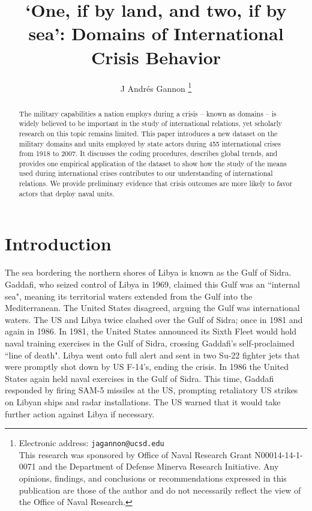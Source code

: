 \documentclass[12pt,letterpaper]{article}
\title{‘One, if by land, and two, if by sea’: Domains of International Crisis Behavior}
\author{J Andr\'{e}s Gannon%
	\thanks{Electronic address: \texttt{jagannon@ucsd.edu} \\ This research was sponsored by Office of Naval Research Grant N00014-14-1-0071 and the Department of Defense Minerva Research Initiative. Any opinions, findings, and conclusions or recommendations expressed in this publication are those of the author and do not necessarily reflect the view of the Office of Naval Research.}}
\affil{Department of Political Science \\ University of California, San Diego}
\begin{document}
\maketitle
	
\begin{abstract}
The military capabilities a nation employs during a crisis -- known as domains -- is widely believed to be important in the study of international relations, yet scholarly research on this topic remains limited. This paper introduces a new dataset on the military domains and units employed by state actors during 455 international crises from 1918 to 2007. It discusses the coding procedures, describes global trends, and provides one empirical application of the dataset to show how the study of the means used during international crises contributes to our understanding of international relations. We provide preliminary evidence that crisis outcomes are more likely to favor actors that deploy naval units.
\end{abstract}

\section{Introduction}
	The sea bordering the northern shores of Libya is known as the Gulf of Sidra. Gaddafi, who seized control of Libya in 1969, claimed this Gulf was an ``internal sea", meaning its territorial waters extended from the Gulf into the Mediterranean. The United States disagreed, arguing the Gulf was international waters. The US and Libya twice clashed over the Gulf of Sidra; once in 1981 and again in 1986. In 1981, the United States announced its Sixth Fleet would hold naval training exercises in the Gulf of Sidra, crossing Gaddafi's self-proclaimed ``line of death". Libya went onto full alert and sent in two Su-22 fighter jets that were promptly shot down by US F-14's, ending the crisis. In 1986 the United States again held naval exercises in the Gulf of Sidra. This time, Gaddafi responded by firing SAM-5 missiles at the US, prompting retaliatory US strikes on Libyan ships and radar installations. The US warned that it would take further action against Libya if necessary.
	
\end{document}
